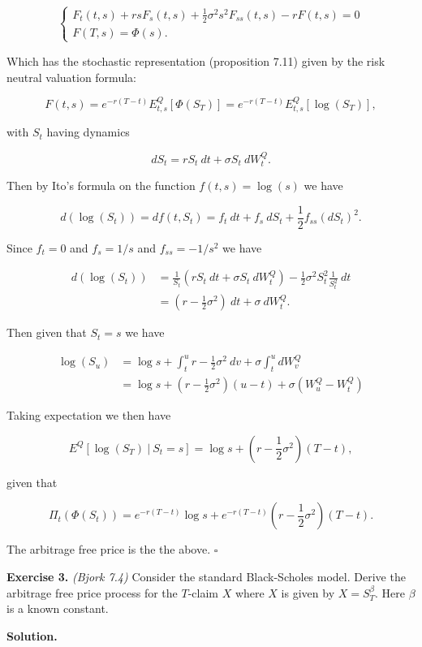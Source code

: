 \documentclass[
]{article}
\begin{document}
\[
\left\{
\begin{matrix}
F_t(t,s) + rsF_s(t,s)+\frac{1}{2}\sigma^2 s^2F_{ss}(t,s)-rF(t,s)=0\\
F(T,s)=\Phi(s).
\end{matrix}
\right.
\]

Which has the stochastic representation (proposition 7.11) given by the
risk neutral valuation formula:

\[
F(t,s)=e^{-r(T-t)}E^Q_{t,s}[\Phi(S_T)]=e^{-r(T-t)}E^Q_{t,s}[\log(S_T)],
\]

with \(S_t\) having dynamics

\[
dS_t=rS_t\ dt+\sigma S_t\ dW_t^Q.
\]

Then by Ito's formula on the function \(f(t,s)=\log(s)\) we have

\[
d(\log(S_t))=d f(t,S_t)=f_t\ dt+f_s\ dS_t+\frac{1}{2}f_{ss}(dS_t)^2.
\]

Since \(f_t=0\) and \(f_s=1/s\) and \(f_{ss}=-1/s^2\) we have

\begin{align*}
d(\log(S_t))&=\frac{1}{S_t}(rS_t\ dt+\sigma S_t\ dW_t^Q)-\frac{1}{2}\sigma^2S_t^2\frac{1}{S_t^2}\ dt\\
&=\left(r-\frac{1}{2}\sigma^2\right)\ dt+\sigma \ dW_t^Q.
\end{align*}

Then given that \(S_t=s\) we have

\begin{align*}
\log(S_u)&=\log s+\int_t^ur-\frac{1}{2}\sigma^2\ dv+\sigma\int_t^u dW_v^Q\\
&=\log s+\left(r-\frac{1}{2}\sigma^2\right)(u-t)+\sigma(W_u^Q-W_t^Q)
\end{align*}

Taking expectation we then have

\[
E^Q[\log(S_T)\ \vert\ S_t=s]=\log s+\left(r-\frac{1}{2}\sigma^2\right)(T-t),
\]

given that

\[
\Pi_t(\Phi(S_t))=e^{-r(T-t)}\log s+e^{-r(T-t)}\left(r-\frac{1}{2}\sigma^2\right)(T-t).
\]

The arbitrage free price is the the above. \(\square\)

\textbf{Exercise 3.} \emph{(Bjork 7.4)} Consider the standard
Black-Scholes model. Derive the arbitrage free price process for the
\(T\)-claim \(X\) where \(X\) is given by \(X=S_T^\beta\). Here
\(\beta\) is a known constant.

\textbf{Solution.}
\end{document}

